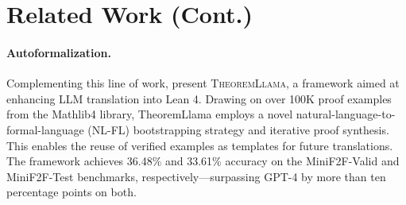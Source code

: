 \documentclass{article}
\begin{document}




\appendix


\section{Related Work (Cont.)}

\paragraph{Autoformalization.} Complementing this line of work, \citet{wang2024theoremLlama} present \textsc{TheoremLlama}, a framework aimed at enhancing LLM translation into Lean 4. Drawing on over 100K proof examples from the Mathlib4 library, TheoremLlama employs a novel natural-language-to-formal-language (NL-FL) bootstrapping strategy and iterative proof synthesis. This enables the reuse of verified examples as templates for future translations. The framework achieves 36.48\% and 33.61\% accuracy on the MiniF2F-Valid and MiniF2F-Test benchmarks, respectively—surpassing GPT-4 by more than ten percentage points on both.
\end{document}
